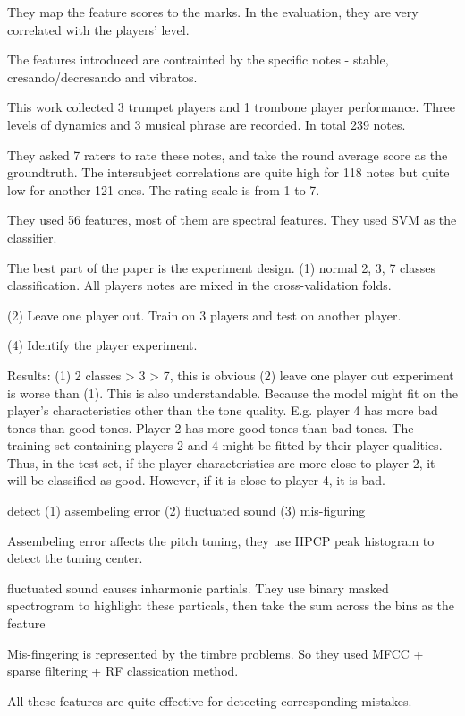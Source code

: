 They map the feature scores to the marks. In the evaluation, they are very correlated with the players' level.

The features introduced are contrainted by the specific notes - stable, cresando/decresando and vibratos.

 This work collected 3 trumpet players and 1 trombone player performance. Three levels of dynamics and 3 musical phrase are recorded. In total 239 notes.

They asked 7 raters to rate these notes, and take the round average score as the groundtruth. The intersubject correlations are quite high for 118 notes but quite low for another 121 ones. The rating scale is from 1 to 7. 

They used 56 features, most of them are spectral features. They used SVM as the classifier.

The best part of the paper is the experiment design.
(1) normal 2, 3, 7 classes classification. All players notes are mixed in the cross-validation folds.

(2) Leave one player out. Train on 3 players and test on another player.

(4) Identify the player experiment.

Results:
(1) 2 classes > 3 > 7, this is obvious
(2) leave one player out experiment is worse than (1). This is also understandable. Because the model might fit on the player's characteristics other than the tone quality. E.g. player 4 has more bad tones than good tones. Player 2 has more good tones than bad tones. The training set containing players 2 and 4 might be fitted by their player qualities. Thus, in the test set, if the player characteristics are more close to player 2, it will be classified as good. However, if it is close to player 4, it is bad.

 detect (1) assembeling error (2) fluctuated sound (3) mis-figuring

Assembeling error affects the pitch tuning, they use HPCP peak histogram to detect the tuning center.

fluctuated sound causes inharmonic partials. They use binary masked spectrogram to highlight these particals, then take the sum across the bins as the feature

Mis-fingering is represented by the timbre problems. So they used MFCC + sparse filtering + RF classication method.

All these features are quite effective for detecting corresponding mistakes.

